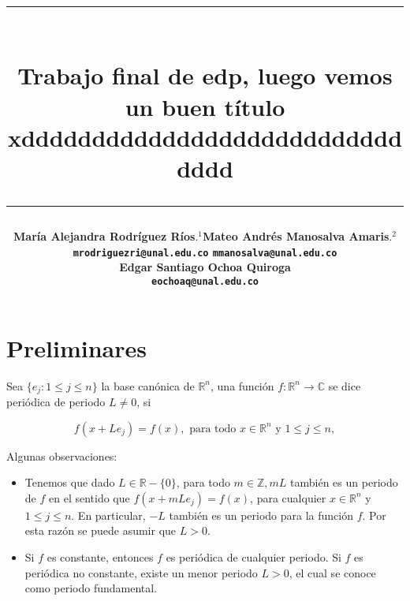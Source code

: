 \documentclass[12pt]{article}
\title{\vspace{-2cm}\par\noindent\rule{16cm}{1pt}\large
\\\bfseries Trabajo final de edp, luego vemos un buen título\\
xddddddddddddddddddddddddddddddd
\vspace{-0.34cm}\par\noindent\hspace{0.15cm}\rule{16cm}{1pt}
\vspace{-0.6cm}
}
\author{\small \bfseries María Alejandra Rodríguez Ríos$.^1$\quad \quad\small Mateo Andrés Manosalva Amaris$.^{2}$\\ \small \texttt{mrodriguezri@unal.edu.co} \quad \quad \quad \quad \quad \quad \quad \quad \texttt{mmanosalva@unal.edu.co}\\ \small \bfseries Edgar Santiago Ochoa Quiroga\\
\small \texttt{eochoaq@unal.edu.co}
}
\newcommand\R{\ensuremath{\mathbb{R}}}
\begin{document}
\maketitle
\begin{abstract}
\lipsum[1]
\end{abstract}

\section{Preliminares}

\begin{definition}
 Sea $\{e_j:  1\leq j\leq n\}$ la base canónica de $\R^n$, una función $f: \mathbb{R}^n \rightarrow \mathbb{C}$ se dice periódica de periodo $L \neq 0$, si

$$
f(x+L e_j)=f(x), \text { para todo } x \in \mathbb{R}^n \text{ y } 1\leq j\leq n, 
$$


\end{definition}

Algunas observaciones:
\begin{itemize}
    \item  Tenemos que dado $L\in \R-\{0\}$, para todo $m \in \mathbb{Z}, m L$ también es un periodo de $f$ en el sentido que $f(x+m L e_j)=f(x)$, para cualquier $x \in \mathbb{R}^n $ y $1\leq j\leq n$. En particular, $-L$ también es un periodo para la función $f$. Por esta razón se puede asumir que $L>0$.
    
    \item Si $f$ es constante, entonces $f$ es periódica de cualquier periodo. Si $f$ es periódica no constante, existe un menor periodo $L>0$, el cual se conoce como periodo fundamental.
\end{itemize}
\end{document}
